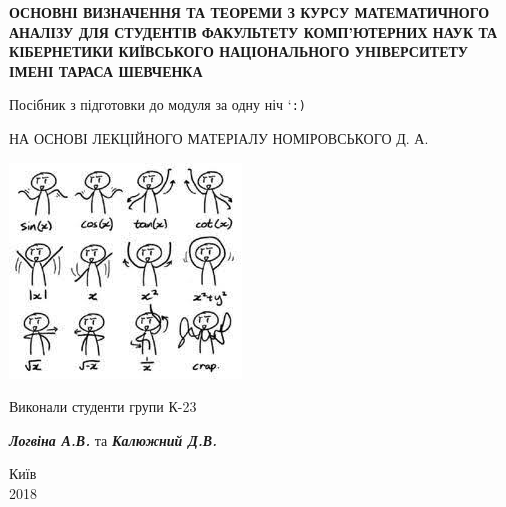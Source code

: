 

\date{}
\usepackage[dvipsnames]{xcolor}
\usepackage{colortbl}
\usepackage{amsmath}
\usepackage{esvect}


\addto{}


\begin{titlepage}
\newpage

\begin{center}
 \large{\textbf{ОСНОВНІ ВИЗНАЧЕННЯ ТА ТЕОРЕМИ З КУРСУ МАТЕМАТИЧНОГО АНАЛІЗУ ДЛЯ СТУДЕНТІВ ФАКУЛЬТЕТУ КОМП'ЮТЕРНИХ НАУК ТА КІБЕРНЕТИКИ КИЇВСЬКОГО НАЦІОНАЛЬНОГО УНІВЕРСИТЕТУ ІМЕНІ ТАРАСА ШЕВЧЕНКА}} \\
\end{center}

\vspace{8em}

\begin{center}
\large{Посібник з підготовки до модуля за одну ніч `\tt{:)}}
\end{center}

\vspace{5em}
\begin{center}
\large{НА ОСНОВІ ЛЕКЦІЙНОГО МАТЕРІАЛУ НОМІРОВСЬКОГО Д. А.} \\ 
\end{center}
\begin{center}

\vspace{8em}

\includegraphics[origin = 10]{images}
\end{center}

\vspace{10em}

\begin{flushright}
Виконали студенти групи К-23 

{\textbf{\textit{Логвіна А.В.}}} та {\textbf{\textit{Калюжний Д.В.}}}
\end{flushright}

\vspace{\fill}

\begin{center}
Київ \\2018
\end{center}

\end{titlepage}
\tableofcontents

